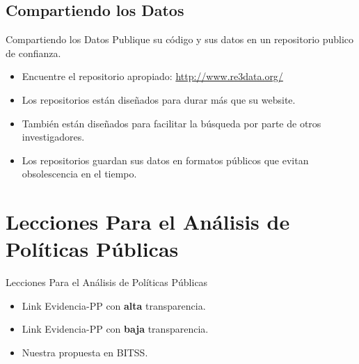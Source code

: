 \documentclass{beamer}
\begin{document}
\subsection*{Compartiendo los Datos}
\begin{frame}{Compartiendo los Datos}
Publique su código y sus datos en un repositorio publico de confianza.\begin{itemize}[<.->]
\item
Encuentre el repositorio apropiado: \url{http://www.re3data.org/}
\item
Los repositorios están diseñados para durar más que su website.
\item
También están diseñados para facilitar la búsqueda por parte de otros investigadores.
\item
Los repositorios guardan sus datos en formatos públicos que evitan obsolescencia en el tiempo.
\end{itemize}
\end{frame}

\section{Lecciones Para el Análisis de Políticas Públicas}

\begin{frame}{Lecciones Para el Análisis de Políticas Públicas}
\begin{itemize}
\item Link Evidencia-PP con \textbf{alta} transparencia. 
\item Link Evidencia-PP con \textbf{baja} transparencia. 
\item Nuestra propuesta en BITSS.
\end{itemize}
\end{frame}
\end{document}
